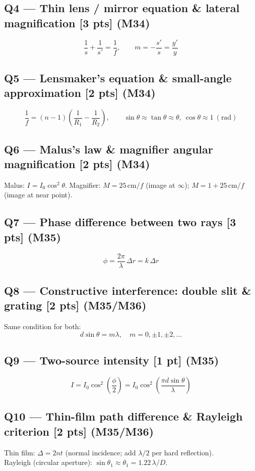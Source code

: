 \documentclass[11pt]{article}
\begin{document}
\subsection*{Q4 --- Thin lens / mirror equation \& lateral magnification [3 pts] (M34)}
\[\frac{1}{s} + \frac{1}{s'} = \frac{1}{f}, \qquad m = -\frac{s'}{s} = \frac{y'}{y}\]

\subsection*{Q5 --- Lensmaker's equation \& small-angle approximation [2 pts] (M34)}
\[\frac{1}{f} = (n-1)\left(\frac{1}{R_1} - \frac{1}{R_2}\right), \qquad \sin\theta\approx\tan\theta\approx\theta,\ \cos\theta\approx 1\ (\text{rad})\]

\subsection*{Q6 --- Malus's law \& magnifier angular magnification [2 pts] (M34)}
Malus: \(I = I_0\cos^2\theta\). \quad Magnifier: \(M = 25\,\mathrm{cm}/f\) (image at \(\infty\)); \(M = 1 + 25\,\mathrm{cm}/f\) (image at near point).

\subsection*{Q7 --- Phase difference between two rays [3 pts] (M35)}
\[\phi = \frac{2\pi}{\lambda}\,\Delta r = k\,\Delta r\]

\subsection*{Q8 --- Constructive interference: double slit \& grating [2 pts] (M35/M36)}
Same condition for both:
\[d\sin\theta = m\lambda, \quad m = 0,\pm 1,\pm 2,\ldots\]

\subsection*{Q9 --- Two-source intensity [1 pt] (M35)}
\[I = I_0\cos^2\!\left(\frac{\phi}{2}\right) = I_0\cos^2\!\left(\frac{\pi d \sin\theta}{\lambda}\right)\]

\subsection*{Q10 --- Thin-film path difference \& Rayleigh criterion [2 pts] (M35/M36)}
Thin film: \(\Delta = 2nt\) (normal incidence; add \(\lambda/2\) per hard reflection).\\
Rayleigh (circular aperture): \(\sin\theta_1 \approx \theta_1 = 1.22\,\lambda/D\).
\end{document}
